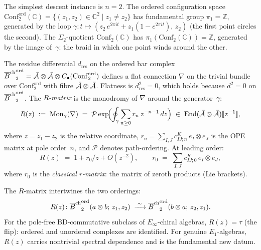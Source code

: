 \begin{construction}
The simplest descent instance is $n=2$. The ordered
configuration space
$\mathrm{Conf}_2^{\mathrm{ord}}(\mathbb C)
=\{(z_1,z_2)\in\mathbb C^2\mid z_1\neq z_2\}$
has fundamental group $\pi_1=\mathbb Z$, generated by the
loop $\gamma\colon t\mapsto
(z_2\,e^{2\pi it}+z_1(1-e^{2\pi it}),\,z_2)$
(the first point circles the second). The $\Sigma_2$-quotient
$\mathrm{Conf}_2(\mathbb C)$ has
$\pi_1(\mathrm{Conf}_2(\mathbb C))=\mathbb Z$, generated by
the image of~$\gamma$: the braid in which one point
winds around the other.

The residue differential $d_{\mathrm{res}}$ on the ordered
bar complex
${\overline{B}^{\mathrm{ch}}}_2^{\mathrm{ord}}=\bar{\mathcal{A}}\otimes\bar{\mathcal{A}}\otimes
C_\bullet(\mathrm{Conf}_2^{\mathrm{ord}})$
defines a flat connection $\nabla$ on the trivial bundle
over $\mathrm{Conf}_2^{\mathrm{ord}}$ with fibre
$\bar{\mathcal{A}}\otimes\bar{\mathcal{A}}$. Flatness is $d_{\mathrm{res}}^2=0$,
which holds because $d^2=0$ on ${\overline{B}^{\mathrm{ch}}}_2^{\mathrm{ord}}$.
The \emph{$R$-matrix} is the monodromy of $\nabla$ around
the generator~$\gamma$:
\begin{equation}%
R(z)
\;:=\;
\operatorname{Mon}_\gamma(\nabla)
\;=\;
\mathcal P\exp\!\Bigl(
\oint_\gamma\sum_{n\ge 0}r_n\,z^{-n-1}\,dz
\Bigr)
\;\in\;
\operatorname{End}(\bar\cA\otimes\bar\cA)[\![z^{-1}]\!],
\end{equation}
where $z=z_1-z_2$ is the relative coordinate,
$r_n=\sum_{I,J}c^K_{IJ;n}\,e_I\otimes e_J$ is the OPE matrix
at pole order~$n$, and $\mathcal P$ denotes path-ordering.
At leading order:
\begin{equation}%
R(z)\;=\;1+r_0/z+O(z^{-2}),
\qquad
r_0\;=\;\sum_{I,J}c^K_{IJ;0}\,e_I\otimes e_J,
\end{equation}
where $r_0$ is the \emph{classical $r$-matrix}: the matrix
of zeroth products (Lie brackets).

The $R$-matrix intertwines the two orderings:
\[
R(z)\colon
{\overline{B}^{\mathrm{ch}}}_2^{\mathrm{ord}}(a\otimes b;\,z_1,z_2)
\;\xrightarrow{\;\sim\;}
{\overline{B}^{\mathrm{ch}}}_2^{\mathrm{ord}}(b\otimes a;\,z_2,z_1).
\]
For the pole-free BD-commutative subclass of
$E_\infty$-chiral algebras, $R(z)=\tau$ (the flip): ordered
and unordered complexes are identified. For genuine
$E_1$-algebras, $R(z)$ carries nontrivial spectral dependence
and is the fundamental new datum.
\end{construction}

